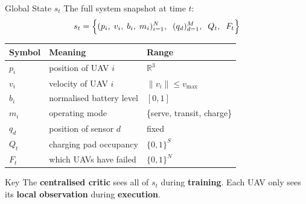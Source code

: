 \documentclass[aspectratio=169,12pt]{beamer}
\begin{document}
\begin{frame}{Global State $s_t$}
The full system snapshot at time $t$:
\[
s_t = \Bigl\{
  (p_i,\; v_i,\; b_i,\; m_i)_{i=1}^{N},\;\;
  (q_d)_{d=1}^{M},\;\;
  Q_t,\;\;
  F_t
\Bigr\}
\]

\vspace{0.4em}
\begin{tabular}{@{}lll@{}}
\toprule
\textbf{Symbol} & \textbf{Meaning} & \textbf{Range} \\
\midrule
$p_i$ & position of UAV $i$ & $\mathbb{R}^3$ \\
$v_i$ & velocity of UAV $i$ & $\|v_i\| \le v_{\max}$ \\
$b_i$ & normalised battery level & $[0,1]$ \\
$m_i$ & operating mode & \{serve, transit, charge\} \\
$q_d$ & position of sensor $d$ & fixed \\
$Q_t$ & charging pad occupancy & $\{0,1\}^S$ \\
$F_t$ & which UAVs have failed & $\{0,1\}^N$ \\
\bottomrule
\end{tabular}

\vspace{0.3em}
\begin{block}{Key}
The \textbf{centralised critic} sees all of $s_t$ during \textbf{training}.
Each UAV only sees its \textbf{local observation} during \textbf{execution}.
\end{block}
\end{frame}
\end{document}
